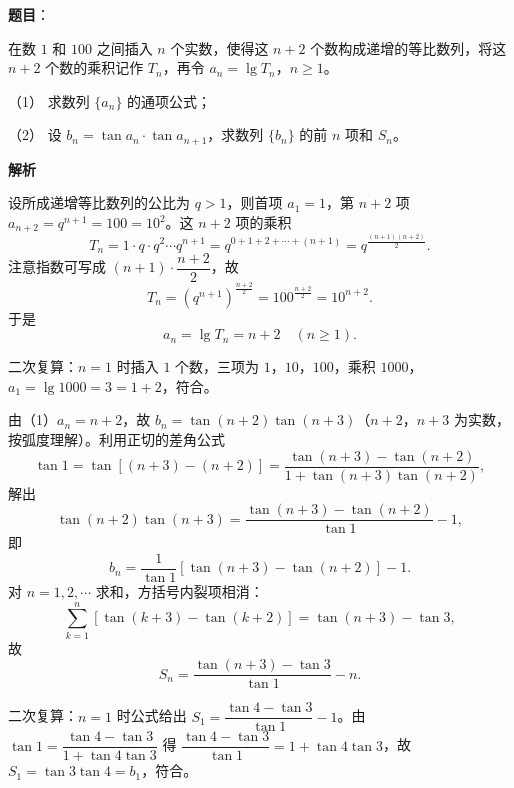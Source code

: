 \begin{answer}

\textbf{题目}：

在数 $1$ 和 $100$ 之间插入 $n$ 个实数，使得这 $n+2$ 个数构成递增的等比数列，将这 $n+2$ 个数的乘积记作 $T_n$，再令 $a_n=\lg T_n$，$n\geqslant 1$。

（1） 求数列 $\{a_n\}$ 的通项公式；

（2） 设 $b_n=\tan a_n\cdot\tan a_{n+1}$，求数列 $\{b_n\}$ 的前 $n$ 项和 $S_n$。

\textbf{解析}

设所成递增等比数列的公比为 $q>1$，则首项 $a_1=1$，第 $n+2$ 项 $a_{n+2}=q^{n+1}=100=10^2$。这 $n+2$ 项的乘积
\nopagebreak[4]
\[T_n=1\cdot q\cdot q^2\cdots q^{n+1}=q^{0+1+2+\cdots+(n+1)}=q^{\frac{(n+1)(n+2)}{2}}.\]
注意指数可写成 $(n+1)\cdot\dfrac{n+2}{2}$，故
\nopagebreak[4]
\[T_n=\left(q^{n+1}\right)^{\frac{n+2}{2}}=100^{\frac{n+2}{2}}=10^{n+2}.\]
于是
\nopagebreak[4]
\[a_n=\lg T_n=n+2\quad(n\geqslant1).\]

二次复算：$n=1$ 时插入 $1$ 个数，三项为 $1$，$10$，$100$，乘积 $1000$，$a_1=\lg1000=3=1+2$，符合。

由（1）$a_n=n+2$，故 $b_n=\tan(n+2)\tan(n+3)$（$n+2$，$n+3$ 为实数，按弧度理解）。利用正切的差角公式
\nopagebreak[4]
\[\tan1=\tan\left[(n+3)-(n+2)\right]=\frac{\tan(n+3)-\tan(n+2)}{1+\tan(n+3)\tan(n+2)},\]
解出
\nopagebreak[4]
\[\tan(n+2)\tan(n+3)=\frac{\tan(n+3)-\tan(n+2)}{\tan1}-1,\]
即
\nopagebreak[4]
\[b_n=\frac{1}{\tan1}\left[\tan(n+3)-\tan(n+2)\right]-1.\]
对 $n=1,2,\cdots$ 求和，方括号内裂项相消：
\nopagebreak[4]
\[\sum_{k=1}^{n}\left[\tan(k+3)-\tan(k+2)\right]=\tan(n+3)-\tan3,\]
故
\nopagebreak[4]
\[S_n=\frac{\tan(n+3)-\tan3}{\tan1}-n.\]

二次复算：$n=1$ 时公式给出 $S_1=\dfrac{\tan4-\tan3}{\tan1}-1$。由 $\tan1=\dfrac{\tan4-\tan3}{1+\tan4\tan3}$ 得 $\dfrac{\tan4-\tan3}{\tan1}=1+\tan4\tan3$，故 $S_1=\tan3\tan4=b_1$，符合。



\end{answer}
